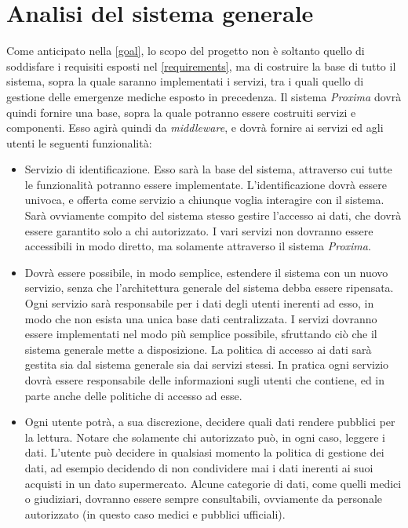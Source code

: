 \documentclass[a4paper,12pt]{report}
\begin{document}
\section{Analisi del sistema generale} \label{general-analysis}
Come anticipato nella \autoref{goal}, lo scopo del progetto non è soltanto quello di soddisfare i requisiti esposti nel \autoref{requirements}, ma di costruire la base di tutto il sistema, sopra la quale saranno implementati i servizi, tra i quali quello di gestione delle emergenze mediche esposto in precedenza. Il sistema \emph{Proxima} dovrà quindi fornire una base, sopra la quale potranno essere costruiti servizi e componenti. Esso agirà quindi da \emph{middleware}, e dovrà fornire ai servizi ed agli utenti le seguenti funzionalità:
\begin{itemize}
	\item Servizio di identificazione. Esso sarà la base del sistema, attraverso cui tutte le funzionalità potranno essere implementate. L'identificazione dovrà essere univoca, e offerta come servizio a chiunque voglia interagire con il sistema. Sarà ovviamente compito del sistema stesso gestire l'accesso ai dati, che dovrà essere garantito solo a chi autorizzato. I vari servizi non dovranno essere accessibili in modo diretto, ma solamente attraverso il sistema \emph{Proxima}.
	\item Dovrà essere possibile, in modo semplice, estendere il sistema con un nuovo servizio, senza che l'architettura generale del sistema debba essere ripensata. Ogni servizio sarà responsabile per i dati degli utenti inerenti ad esso, in modo che non esista una unica base dati centralizzata. I servizi dovranno essere implementati nel modo più semplice possibile, sfruttando ciò che il sistema generale mette a disposizione. La politica di accesso ai dati sarà gestita sia dal sistema generale sia dai servizi stessi. In pratica ogni servizio dovrà essere responsabile delle informazioni sugli utenti che contiene, ed in parte anche delle politiche di accesso ad esse.
	\item Ogni utente potrà, a sua discrezione, decidere quali dati rendere pubblici per la lettura. Notare che solamente chi autorizzato può, in ogni caso, leggere i dati. L'utente può decidere in qualsiasi momento la politica di gestione dei dati, ad esempio decidendo di non condividere mai i dati inerenti ai suoi acquisti in un dato supermercato. Alcune categorie di dati, come quelli medici o giudiziari, dovranno essere sempre consultabili, ovviamente da personale autorizzato (in questo caso medici e pubblici ufficiali).

\end{itemize}
\end{document}

